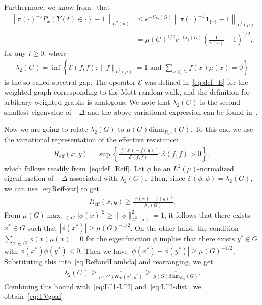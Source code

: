 \documentclass[10pt]{amsart}
\theoremstyle{definition}\newtheorem{defi}[theo]{Definition}\newtheorem{rema}[theo]{Remark}\newtheorem{exam}[theo]{Example}\newtheorem{exem}[theo]{Example}\newtheorem{nota}[theo]{Notation}
\newcommand{\clE}{\mathcal{E}}
\newcommand{\bfun}{\mathbf{1}}
\begin{document}
Furthermore, we know from~\cite[Corollary~5.9]{Barbook} that
\begin{equation}\label{eq:L^2-dist}
\begin{split}
\left\|\pi(\cdot)^{-1}P_x(Y(t)\in\cdot)-1\right\|_{L^2(\mu)} &\le e^{-t \lambda_2(G)} \left\|\pi(\cdot)^{-1}\bfun_{\{x\}}-1\right\|_{L^2(\mu)}\\
&= \mu(G)^{1/2}e^{-t\lambda_2(G)}\left(\frac{1}{\pi(x)}-1\right)^{1/2},
\end{split}
\end{equation}
for any $t\ge 0$, where
\begin{align*}
\lambda_2(G)=\inf\left\{\clE(f,f)\colon \|f\|_{L^2(\mu)}=1 \text{ and }\sum_{x\,\in\,G}f(x)\mu(x) =0\right\}
\end{align*}
is the so-called spectral gap. The operator $\clE$ was defined in~\eqref{eq:def_E} for the weighted graph corresponding to the Mott random walk, and the definition for arbitrary weighted graphs is analogous. We note that $\lambda_2(G)$ is the second smallest eigenvalue of $-\Delta$ and the above variational expression can be found in~\cite[Lemma~3.36]{Barbook}.

Now we are going to relate $\lambda_2(G)$ to $\mu(G)\text{diam}_{R_{\text{eff}}}(G)$. To this end we use the variational representation of the effective resistance:
\begin{align}\label{eq:Reff-var}
R_{\text{eff}}(x,y)=\sup\left\{\frac{\left|f(x)-f(y)\right|^2}{\clE(f,f)}\colon \clE(f,f)>0\right\},
\end{align}
which follows readily from~\eqref{eq:def_Reff}. Let $\phi$ be an $L^2(\mu)$-normalized eigenfunction of $-\Delta$ associated with $\lambda_2(G)$. Then, since $\clE(\phi,\phi)=\lambda_2(G)$, we can use~\eqref{eq:Reff-var} to get
\begin{align}\label{eq:ReffandLambda}
R_{\text{eff}}(x,y)\ge \frac{\left|\phi(x)-\phi(y)\right|^2}{\lambda_2(G)}.
\end{align}
From $\mu(G)\max_{x\,\in\,G}|\phi(x)|^2\ge\|\phi\|_{L^2(\mu)}^2=1$, it follows that there exists $x^*\in G$ such that $|\phi(x^*)|\ge \mu(G)^{-1/2}$. On the other hand, the condition $\sum_{x\,\in\,G} \phi(x)\mu(x)=0$ for the eigenfunction $\phi$ implies that there exists $y^*\in G$ with $\phi(x^*)\phi(y^*)<0$. Then we have $|\phi(x^*)-\phi(y^*)|\ge \mu(G)^{-1/2}$. Substituting this into~\eqref{eq:ReffandLambda} and rearranging, we get
\begin{align*}
\lambda_2(G)\ge \frac{1}{\mu(G) R_{\text{eff}}(x^*,y^*)} \ge \frac{1}{\mu(G)\text{diam}_{R_{\text{eff}}}(G)}.
\end{align*}
Combining this bound with~\eqref{eq:L^1-L^2} and~\eqref{eq:L^2-dist}, we obtain~\eqref{eq:TVgoal}.
\end{document}
